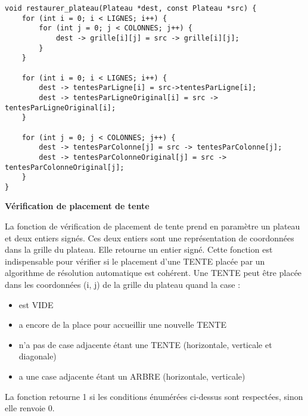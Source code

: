\documentclass{article}
\begin{document}
\begin{lstlisting}[style=Cstyle]
void restaurer_plateau(Plateau *dest, const Plateau *src) {
    for (int i = 0; i < LIGNES; i++) {
        for (int j = 0; j < COLONNES; j++) {
            dest -> grille[i][j] = src -> grille[i][j];
        }
    }

    for (int i = 0; i < LIGNES; i++) {
        dest -> tentesParLigne[i] = src->tentesParLigne[i];
        dest -> tentesParLigneOriginal[i] = src -> tentesParLigneOriginal[i];
    }

    for (int j = 0; j < COLONNES; j++) {
        dest -> tentesParColonne[j] = src -> tentesParColonne[j];
        dest -> tentesParColonneOriginal[j] = src -> tentesParColonneOriginal[j];
    }
}
\end{lstlisting}

\textbf{Vérification de placement de tente}

    La fonction de vérification de placement de tente prend en paramètre un plateau et deux entiers signés. Ces deux entiers sont une représentation de coordonnées dans la grille du plateau. Elle retourne un entier signé. Cette fonction est indispensable pour vérifier si le placement d'une TENTE placée par un algorithme de résolution automatique est cohérent.
    Une TENTE peut être placée dans les coordonnées (i, j) de la grille du plateau quand la case :
    \begin{itemize}
    \item est VIDE
    \item a encore de la place pour accueillir une nouvelle TENTE
    \item n'a pas de case adjacente étant une TENTE (horizontale, verticale et diagonale)
    \item a une case adjacente étant un ARBRE (horizontale, verticale)
    \end{itemize}
    La fonction retourne 1 si les conditions énumérées ci-dessus sont respectées, sinon elle renvoie 0.
\end{document}
